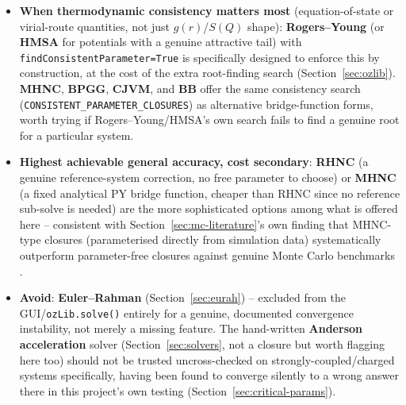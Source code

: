 \documentclass[11pt,a4paper]{article}
\newcommand{\code}[1]{\texttt{#1}}
\begin{document}
\begin{itemize}[nosep]
    A caveat that matters for this software specifically: their comparison
    covers single-component, uncharged, spherically symmetric systems. The
    potentials most used here --- short-range attractive with long-range
    repulsion, square wells, charged colloids --- are exactly the ones they
    exclude, as ``such systems often depend on a multitude of parameters
    that must be carefully chosen''. So the split above is a starting point
    for those cases rather than a conclusion, which is an argument for
    running the approximation-error panel on the system at hand.
  \item \textbf{When thermodynamic consistency matters most} (equation-of-state
    or virial-route quantities, not just $g(r)$/$S(Q)$ shape): \textbf{Rogers--Young}
    (or \textbf{HMSA} for potentials with a genuine attractive tail) with
    \code{findConsistentParameter=True} is specifically designed to enforce
    this by construction, at the cost of the extra root-finding search
    (Section~\ref{sec:ozlib}). \textbf{MHNC}, \textbf{BPGG}, \textbf{CJVM},
    and \textbf{BB} offer the same consistency search
    (\code{CONSISTENT\_PARAMETER\_CLOSURES}) as alternative bridge-function
    forms, worth trying if Rogers--Young/HMSA's own search fails to find a
    genuine root for a particular system.
  \item \textbf{Highest achievable general accuracy, cost secondary}:
    \textbf{RHNC} (a genuine reference-system correction, no free parameter
    to choose) or \textbf{MHNC} (a fixed analytical PY bridge function,
    cheaper than RHNC since no reference sub-solve is needed) are the more
    sophisticated options among what is offered here -- consistent with
    Section~\ref{sec:mc-literature}'s own finding that MHNC-type closures
    (parameterised directly from simulation data) systematically outperform
    parameter-free closures against genuine Monte Carlo benchmarks
    \cite{PihlajamaaJanssen2024}.
  \item \textbf{Avoid}: \textbf{Euler--Rahman} (Section~\ref{sec:eurah}) --
    excluded from the GUI/\code{ozLib.solve()} entirely for a
    genuine, documented convergence instability, not merely a missing
    feature. The hand-written \textbf{Anderson acceleration} solver
    (Section~\ref{sec:solvers}, not a closure but worth flagging here too)
    should not be trusted uncross-checked on strongly-coupled/charged
    systems specifically, having been found to converge silently to a wrong
    answer there in this project's own testing
    (Section~\ref{sec:critical-params}).

\end{itemize}
\end{document}
